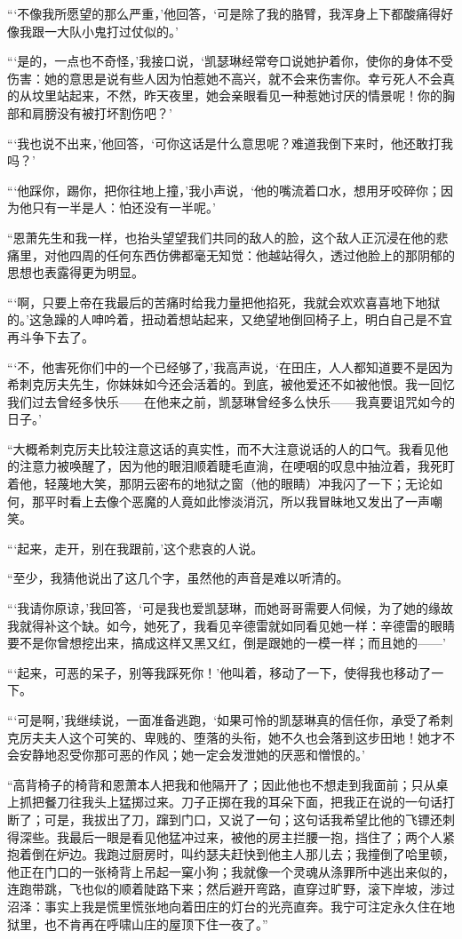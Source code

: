 \par “‘不像我所愿望的那么严重，’他回答，‘可是除了我的胳臂，我浑身上下都酸痛得好像我跟一大队小鬼打过仗似的。’
\par “‘是的，一点也不奇怪，’我接口说，‘凯瑟琳经常夸口说她护着你，使你的身体不受伤害：她的意思是说有些人因为怕惹她不高兴，就不会来伤害你。幸亏死人不会真的从坟里站起来，不然，昨天夜里，她会亲眼看见一种惹她讨厌的情景呢！你的胸部和肩膀没有被打坏割伤吧？’
\par “‘我也说不出来，’他回答，‘可你这话是什么意思呢？难道我倒下来时，他还敢打我吗？’
\par “‘他踩你，踢你，把你往地上撞，’我小声说，‘他的嘴流着口水，想用牙咬碎你；因为他只有一半是人：怕还没有一半呢。’
\par “恩萧先生和我一样，也抬头望望我们共同的敌人的脸，这个敌人正沉浸在他的悲痛里，对他四周的任何东西仿佛都毫无知觉：他越站得久，透过他脸上的那阴郁的思想也表露得更为明显。
\par “‘啊，只要上帝在我最后的苦痛时给我力量把他掐死，我就会欢欢喜喜地下地狱的。’这急躁的人呻吟着，扭动着想站起来，又绝望地倒回椅子上，明白自己是不宜再斗争下去了。
\par “‘不，他害死你们中的一个已经够了，’我高声说，‘在田庄，人人都知道要不是因为希刺克厉夫先生，你妹妹如今还会活着的。到底，被他爱还不如被他恨。我一回忆我们过去曾经多快乐——在他来之前，凯瑟琳曾经多么快乐——我真要诅咒如今的日子。’
\par “大概希刺克厉夫比较注意这话的真实性，而不大注意说话的人的口气。我看见他的注意力被唤醒了，因为他的眼泪顺着睫毛直淌，在哽咽的叹息中抽泣着，我死盯着他，轻蔑地大笑，那阴云密布的地狱之窗（他的眼睛）冲我闪了一下；无论如何，那平时看上去像个恶魔的人竟如此惨淡消沉，所以我冒昧地又发出了一声嘲笑。
\par “‘起来，走开，别在我跟前，’这个悲哀的人说。
\par “至少，我猜他说出了这几个字，虽然他的声音是难以听清的。
\par “‘我请你原谅，’我回答，‘可是我也爱凯瑟琳，而她哥哥需要人伺候，为了她的缘故我就得补这个缺。如今，她死了，我看见辛德雷就如同看见她一样：辛德雷的眼睛要不是你曾想挖出来，搞成这样又黑又红，倒是跟她的一模一样；而且她的——’
\par “‘起来，可恶的呆子，别等我踩死你！’他叫着，移动了一下，使得我也移动了一下。
\par “‘可是啊，’我继续说，一面准备逃跑，‘如果可怜的凯瑟琳真的信任你，承受了希刺克厉夫夫人这个可笑的、卑贱的、堕落的头衔，她不久也会落到这步田地！她才不会安静地忍受你那可恶的作风；她一定会发泄她的厌恶和憎恨的。’
\par “高背椅子的椅背和恩萧本人把我和他隔开了；因此他也不想走到我面前；只从桌上抓把餐刀往我头上猛掷过来。刀子正掷在我的耳朵下面，把我正在说的一句话打断了；可是，我拔出了刀，蹿到门口，又说了一句；这句话我希望比他的飞镖还刺得深些。我最后一眼是看见他猛冲过来，被他的房主拦腰一抱，挡住了；两个人紧抱着倒在炉边。我跑过厨房时，叫约瑟夫赶快到他主人那儿去；我撞倒了哈里顿，他正在门口的一张椅背上吊起一窠小狗；我就像一个灵魂从涤罪所中逃出来似的，连跑带跳，飞也似的顺着陡路下来；然后避开弯路，直穿过旷野，滚下岸坡，涉过沼泽：事实上我是慌里慌张地向着田庄的灯台的光亮直奔。我宁可注定永久住在地狱里，也不肯再在呼啸山庄的屋顶下住一夜了。”
